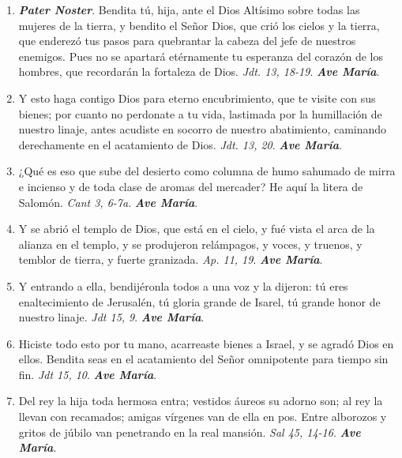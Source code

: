 \documentclass[11pt,a4paper]{book}
\begin{document}
    \begin{enumerate}
    
        \item \textbf{\emph{Pater Noster}}. Bendita tú, hija, ante el Dios Altísimo sobre todas las mujeres de la tierra,
            y bendito el Señor Dios, que crió los cielos y la tierra, que enderezó tus pasos para quebrantar la cabeza del jefe 
            de nuestros enemigos. Pues no se apartará etérnamente tu esperanza del corazón de los hombres, que recordarán la fortaleza de Dios. 
            \emph{Jdt. 13, 18-19}. \textbf{\emph{Ave María}}.

        \item Y esto haga contigo Dios para eterno encubrimiento, que te visite con sus bienes; por cuanto no perdonate a tu vida, 
            lastimada por la humillación de nuestro linaje, antes acudiste en socorro de nuestro abatimiento, 
            caminando derechamente en el acatamiento de Dios. \emph{Jdt. 13, 20}. \textbf{\emph{Ave María}}.

        \item ¿Qué es eso que sube del desierto como columna de humo sahumado de mirra e incienso y de toda clase de aromas del mercader? 
            He aquí la litera de Salomón. \emph{Cant 3, 6-7a}. \textbf{\emph{Ave María}}.

        \item Y se abrió el templo de Dios, que está en el cielo, y fué vista el arca de la alianza en el templo, y se produjeron relámpagos, y voces, y truenos, 
            y temblor de tierra, y fuerte granizada. \emph{Ap. 11, 19}. \textbf{\emph{Ave María}}.

        \item Y entrando a ella, bendijéronla todos a una voz y la dijeron: tú eres enaltecimiento de Jerusalén, tú gloria grande de Isarel, tú grande honor de nuestro linaje. 
            \emph{Jdt 15, 9}. \textbf{\emph{Ave María}}.

        \item Hiciste todo esto por tu mano, acarreaste bienes a Israel, y se agradó Dios en ellos. Bendita seas en el acatamiento del Señor omnipotente para tiempo sin fin. 
            \emph{Jdt 15, 10}. \textbf{\emph{Ave María}}.

        \item Del rey la hija toda hermosa entra; vestidos áureos su adorno son; al rey la llevan con recamados; amigas vírgenes van de ella en pos. 
            Entre alborozos y gritos de júbilo van penetrando en la real mansión. \emph{Sal 45, 14-16}. \textbf{\emph{Ave María}}.


\end{enumerate}
\end{document}
